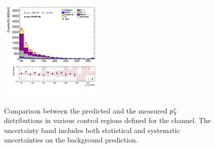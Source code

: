 \begin{figure}[!htp]
\begin{center}
			\includegraphics[width=0.45\textwidth]{chapters/chapter6_HPlus/images/taujets/tau_0_pt_BVETO_MT100.png} \\
			\end{center}
			\caption{
			Comparison between the predicted and the measured $p_{\text{T}}^{\tau}$ distributions in various control regions defined for the \taujets channel. The uncertainty band includes both statistical and systematic uncertainties on the background prediction. 
			}
			\label{fig:bkg-tau-pt-taujets}
		\end{figure}

